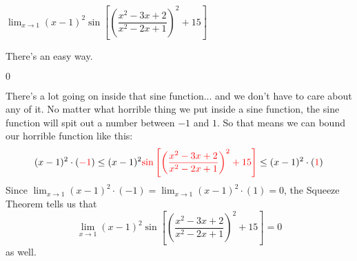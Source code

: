\begin{question}
$\displaystyle\lim_{x \rightarrow 1} (x-1)^2\sin\left[\left(\dfrac{x^2-3x+2}{x^2-2x+1}\right)^2+15\right]$
\end{question}
\begin{hint} There's an easy way.
\end{hint}
\begin{answer} $0$
\end{answer}
\begin{solution} There's a lot going on inside that sine function... and we don't have to care about any of it. No matter what horrible thing we put inside a sine function, the sine function will spit out a number between $-1$ and $1$. So that means we can bound our horrible function like this:
\[(x-1)^2\cdot(\textcolor{red}{-1}) \leq (x-1)^2\textcolor{red}{\sin\left[\left(\dfrac{x^2-3x+2}{x^2-2x+1}\right)^2+15\right]}\leq(x-1)^2\cdot(\textcolor{red}{1})\]
Since $\displaystyle\lim_{x \rightarrow 1}(x-1)^2\cdot(-1) = \displaystyle\lim_{x\rightarrow1}(x-1)^2\cdot(1)=0$, the Squeeze Theorem tells us that
\[\displaystyle\lim_{x \rightarrow 1} (x-1)^2\sin\left[\left(\dfrac{x^2-3x+2}{x^2-2x+1}\right)^2+15\right]=0\] as well.
\end{solution}



